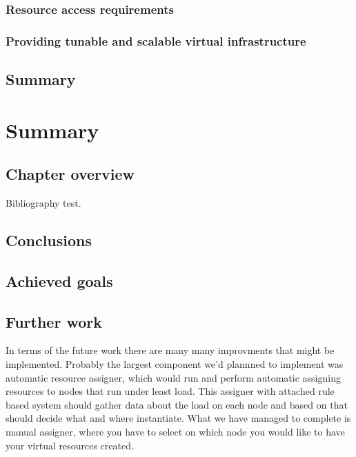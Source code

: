 \documentclass[11pt]{book}
\begin{document}
      \subsection{Resource access requirements}

      \subsection{Providing tunable and scalable virtual infrastructure}


    \section*{Summary}


  \chapter{Summary}

    \section*{Chapter overview}

      Bibliography \cite{mittelbach2004} test.
	
		

    \section{Conclusions}
	
		

    \section{Achieved goals}
	
		

    \section{Further work}
	
	In terms of the future work there are many many improvments that might be implemented. Probably the largest component we'd plannned to implement was automatic resource assigner, which would run
        and perform automatic assigning resources to nodes that run under least load. This assigner with attached rule based system should gather data about the load on each node and based on that should 
        decide what and where instantiate. What we have managed to complete is manual assigner, where you have to select on which node you would like to have your virtual resources created.
\end{document}

